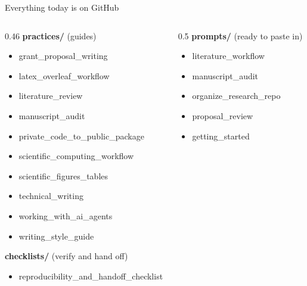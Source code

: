 \begin{frame}[fragile]{Everything today is on GitHub}
  \vfill
  \vspace{-0.75cm}
  \begin{columns}[t]
    \begin{column}{0.46\textwidth}
      {\small\textbf{practices/} \scriptsize(guides)}
      \begin{itemize}\scriptsize\setlength\itemsep{0.15em}
        \item grant\_proposal\_writing
        \item latex\_overleaf\_workflow
        \item literature\_review
        \item manuscript\_audit
        \item private\_code\_to\_public\_package
        \item scientific\_computing\_workflow
        \item scientific\_figures\_tables
        \item technical\_writing
        \item working\_with\_ai\_agents
        \item writing\_style\_guide
      \end{itemize}
      \vspace{0.25em}
      {\small\textbf{checklists/} \scriptsize(verify and hand off)}
      \begin{itemize}\scriptsize\setlength\itemsep{0.15em}
        \item reproducibility\_and\_handoff\_checklist
      \end{itemize}
    \end{column}
    \begin{column}{0.5\textwidth}
      {\small\textbf{prompts/} \scriptsize(ready to paste in)}
      \begin{itemize}\scriptsize\setlength\itemsep{0.15em}
        \item literature\_workflow
        \item manuscript\_audit
        \item organize\_research\_repo
        \item proposal\_review
        \item getting\_started
      \end{itemize}
      \vspace{0.5em}

\end{column}
\end{columns}
\end{frame}
